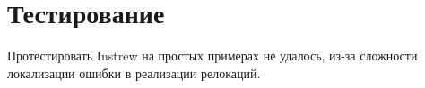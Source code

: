 
\section{Тестирование}
Протестировать Instrew на простых примерах не удалось, из-за сложности локализации ошибки в реализации релокаций.





